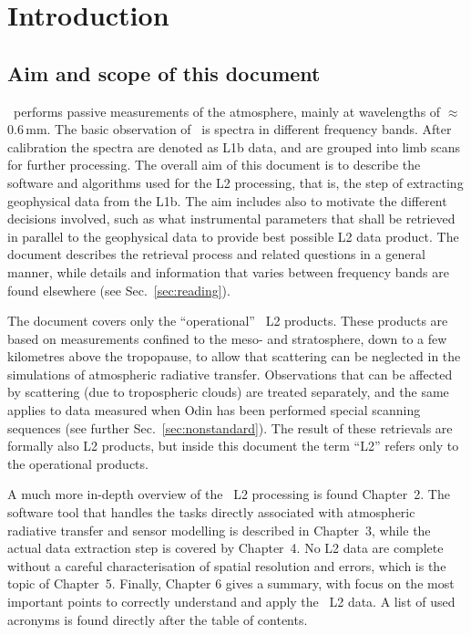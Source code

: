 \chapter{Introduction}
\label{chapter:introduction}

\setcounter{page}{1}


\section{Aim and scope of this document}
\label{sec:aim}
%
\smr\ performs passive measurements of the atmosphere, mainly at wavelengths of
$\approx$ 0.6\,mm. The basic observation of \smr\ is spectra in different
frequency bands. After calibration the spectra are denoted as L1b data, and are
grouped into limb scans for further processing. The overall aim of this
document is to describe the software and algorithms used for the L2 processing,
that is, the step of extracting geophysical data from the L1b. The aim includes
also to motivate the different decisions involved, such as what instrumental
parameters that shall be retrieved in parallel to the geophysical data to
provide best possible L2 data product. The document describes the retrieval
process and related questions in a general manner, while details and
information that varies between frequency bands are found elsewhere (see
Sec.~\ref{sec:reading}).

The document covers only the ``operational'' \smr\ L2 products. These products
are based on measurements confined to the meso- and stratosphere, down to a few
kilometres above the tropopause, to
allow that scattering can be neglected in the simulations of atmospheric
radiative transfer. Observations that can be affected by scattering (due to
tropospheric clouds) are treated separately, and the same applies to data
measured when Odin has been performed special scanning sequences (see further
Sec.~\ref{sec:nonstandard}). The result of these retrievals are formally also
L2 products, but inside this document the term ``L2'' refers only to the
operational products.

A much more in-depth overview of the \smr\ L2 processing is found Chapter~2.
The software tool that handles the tasks directly associated with atmospheric
radiative transfer and sensor modelling is described in Chapter~3, while the
actual data extraction step is covered by Chapter~4. No L2 data are complete
without a careful characterisation of spatial resolution and errors, which is
the topic of Chapter~5. Finally, Chapter 6 gives a summary, with focus on the
most important points to correctly understand and apply the \smr\ L2 data.
A list of used acronyms is found directly after the table of contents.





